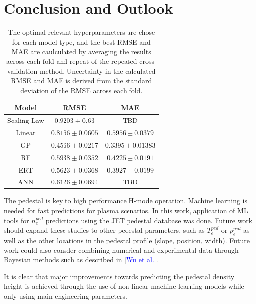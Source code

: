 \documentclass[a4paper, twoside, final, 12pt]{article}
\begin{document}
{\section{Conclusion and Outlook}
\begin{table}[h]
	\begin{center}
		\begin{tabular}{| c | c | c |}
		\hline
		Model & RMSE & MAE \\
		\hline
		Scaling Law & $0.9203 \pm 0.63$ & TBD \\
		\hline
		Linear & $0.8166 \pm 0.0605 $ & $0.5956 \pm 0.0379$ \\
		GP & $0.4566 \pm  0.0217$ &  $0.3395 \pm 0.01383$\\
		RF & $0.5938 \pm 0.0352$ & $0.4225 \pm 0.0191$ \\
		ERT &$0.5623 \pm 0.0368 $ & $0.3927 \pm 0.0199$ \\
		ANN & $0.6126 \pm 0.0694$ & TBD \\
		\hline
		\end{tabular}
		\caption{The optimal relevant hyperparameters are chose for each model type, and the best RMSE and MAE are caulculated by averaging the results across each fold and repeat of the repeated cross-validation method. Uncertainty in the calculated RMSE and MAE is derived from the  standard deviation of the RMSE across each fold.}
		\label{tab:performance_models}
	\end{center}
\end{table}
The pedestal is key to high performance H-mode operation. Machine learning is needed for fast predictions for plasma scenarios. In this work, application of ML tools for $n_e^{ped}$ predictions using the JET pedestal database was done. Future work should expand these studies to other pedestal parameters, such as $T_e^{ped} \text{ or } p_e^{ped}$ as well as the other locations in the pedestal profile (slope, position, width). Future work could also consder combining numerical and experimental data through Bayesian methods such as described in [\textcolor{blue}{Wu et al.}]. 

It is clear that major improvements towards predicting the pedestal density height is achieved through the use of non-linear machine learning models while only using main engineering parameters.

}
\end{document}
